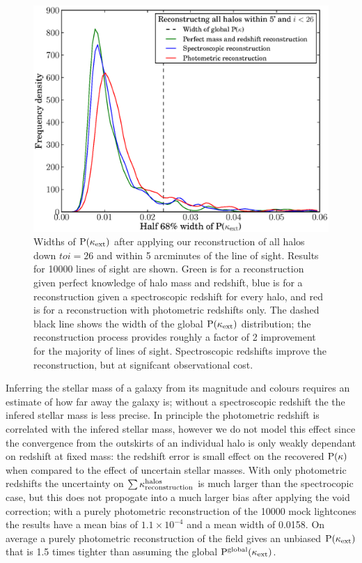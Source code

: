 \documentclass[useAMS,usenatbib]{mn2e}
\begin{document}
\begin{figure}
\includegraphics[width=\columnwidth]{figs/widths.eps}
\caption{Widths of ${\rm P}(\kappa_{\rm ext})$ after applying our reconstruction of all halos down $to i=26$ and within 5 arcminutes of the line of sight. Results for 10000 lines of sight are shown. Green is for a reconstruction given perfect knowledge of halo mass and redshift, blue is for a reconstruction given a spectroscopic redshift for every halo, and red is for a reconstruction with photometric redshifts only. The dashed black line shows the width of the global ${\rm P}(\kappa_{\rm ext})$ distribution; the reconstruction process provides roughly a factor of 2 improvement for the majority of lines of sight. Spectroscopic redshifts improve the reconstruction, but at signifcant observational cost.}
\label{fig:width1}
\end{figure}

Inferring the stellar mass of a galaxy from its magnitude and colours requires an estimate of how far away the galaxy is; without a spectroscopic redshift the the infered stellar mass is less precise. In principle the photometric redshift is correlated with the infered stellar mass, however we do not model this effect since the convergence from the outskirts of an individual halo is only weakly dependant on redshift at fixed mass: the redshift error is small effect on the recovered ${\rm P}(\kappa)$ when compared to the effect of uncertain stellar masses.  With only photometric redshifts the uncertainty on $\sum\kappa_{\rm reconstruction}^{\rm halos}$ is much larger than the spectrocopic case, but this does not propogate into a much larger bias after applying the void correction; with a purely photometric reconstruction of the 10000 mock lightcones the results have a mean bias of $1.1\times 10^{-4}$ and a mean width of 0.0158. On average a purely photometric reconstruction of the field gives an unbiased ${\rm P}(\kappa_{\rm ext})$ that is 1.5 times tighter than assuming the global ${\rm P}^{\rm global}(\kappa_{\rm ext})$. 
\end{document}
